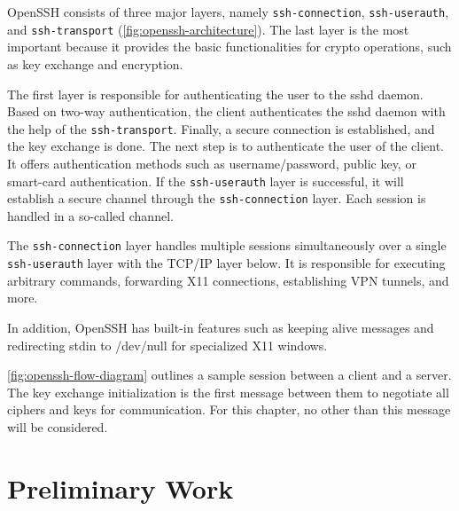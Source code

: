 OpenSSH consists of three major layers, namely \verb|ssh-connection|, \verb|ssh-userauth|, and \verb|ssh-transport| (\autoref{fig:openssh-architecture}).
The last layer is the most important because it provides the basic functionalities for crypto operations, such as key exchange and encryption.

The first layer is responsible for authenticating the user to the sshd daemon.
Based on two-way authentication, the client authenticates the sshd daemon with the help of the \verb|ssh-transport|.
Finally, a secure connection is established, and the key exchange is done.
The next step is to authenticate the user of the client.
It offers authentication methods such as username/password, public key, or smart-card authentication.
If the \verb|ssh-userauth| layer is successful, it will establish a secure channel through the \verb|ssh-connection| layer.
Each session is handled in a so-called channel.

The \verb|ssh-connection| layer handles multiple sessions simultaneously over a single \verb|ssh-userauth| layer with the TCP/IP layer below.
It is responsible for executing arbitrary commands, forwarding X11 connections, establishing VPN tunnels, and more.

In addition, OpenSSH has built-in features such as keeping alive messages and redirecting stdin to /dev/null for specialized X11 windows.

\autoref{fig:openssh-flow-diagram} outlines a sample session between a client and a server.
The key exchange initialization is the first message between them to negotiate all ciphers and keys for communication.
For this chapter, no other than this message will be considered.

\section{Preliminary Work}

